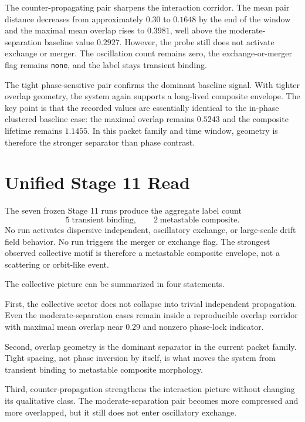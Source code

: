 \documentclass[11pt]{article}
\begin{document}
The counter-propagating pair sharpens the interaction corridor. The mean pair distance decreases from approximately $0.30$ to $0.1648$ by the end of the window and the maximal mean overlap rises to $0.3981$, well above the moderate-separation baseline value $0.2927$. However, the probe still does not activate exchange or merger. The oscillation count remains zero, the exchange-or-merger flag remains \texttt{none}, and the label stays transient binding.

The tight phase-sensitive pair confirms the dominant baseline signal. With tighter overlap geometry, the system again supports a long-lived composite envelope. The key point is that the recorded values are essentially identical to the in-phase clustered baseline case: the maximal overlap remains $0.5243$ and the composite lifetime remains $1.1455$. In this packet family and time window, geometry is therefore the stronger separator than phase contrast.

\section{Unified Stage 11 Read}
The seven frozen Stage 11 runs produce the aggregate label count
\begin{equation}
5\;\text{transient binding},\qquad 2\;\text{metastable composite}.
\end{equation}
No run activates dispersive independent, oscillatory exchange, or large-scale drift field behavior. No run triggers the merger or exchange flag. The strongest observed collective motif is therefore a metastable composite envelope, not a scattering or orbit-like event.

The collective picture can be summarized in four statements.

First, the collective sector does not collapse into trivial independent propagation. Even the moderate-separation cases remain inside a reproducible overlap corridor with maximal mean overlap near $0.29$ and nonzero phase-lock indicator.

Second, overlap geometry is the dominant separator in the current packet family. Tight spacing, not phase inversion by itself, is what moves the system from transient binding to metastable composite morphology.

Third, counter-propagation strengthens the interaction picture without changing its qualitative class. The moderate-separation pair becomes more compressed and more overlapped, but it still does not enter oscillatory exchange.
\end{document}
